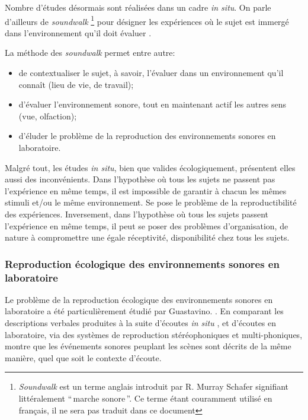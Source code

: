 Nombre d'études désormais sont réalisées dans un cadre \emph{in situ}. On parle d'ailleurs de \emph{soundwalk}  \footnote{\emph{Soundwalk} est un terme anglais introduit par R. Murray Schafer \citep{schafer1969new} signifiant littéralement ``\,marche sonore\,''. Ce terme étant couramment utilisé en français, il ne sera pas traduit dans ce document} pour désigner les expériences où le sujet est immergé dans l'environnement qu'il doit évaluer \citep{adams2008soundwalking,jeon2013soundwalk}.


La méthode des \emph{soundwalk} permet entre autre:

\begin{itemize}
\item  de contextualiser le sujet, à savoir, l'évaluer dans un environnement qu'il connaît (lieu de vie, de travail);
\item d'évaluer l'environnement sonore, tout en maintenant actif les autres sens (vue, olfaction);
\item d'éluder le problème de la reproduction des environnements sonores en laboratoire.
\end{itemize}

Malgré tout, les études \emph{in situ}, bien que valides écologiquement, présentent elles aussi des inconvénients. Dans l'hypothèse où tous les sujets ne passent pas l'expérience en même temps, il est impossible de garantir à chacun les mêmes stimuli et/ou le même environnement. Se pose le problème de la reproductibilité des expériences. Inversement, dans l'hypothèse où tous les sujets passent l'expérience en même temps, il peut se poser des problèmes d'organisation, de nature à compromettre une égale réceptivité, disponibilité chez tous les sujets.

\subsubsection{Reproduction écologique des environnements sonores en laboratoire}

Le problème de la reproduction écologique des environnements sonores en laboratoire a été particulièrement étudié par Guastavino. \citep{guastavino2003approche,guastavino2004perceptual,guastavino2005ecological}. En comparant les descriptions verbales produites à la suite d'écoutes \emph{in situ} , et d'écoutes en laboratoire, via des systèmes de reproduction stéréophoniques et multi-phoniques, \citep{guastavino2005ecological} montre que les événements sonores peuplant les scènes sont décrits de la même manière, quel que soit le contexte d'écoute.

